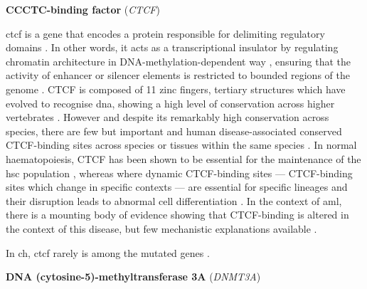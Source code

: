 \noindent \textbf{CCCTC-binding factor} (\textit{CTCF})

\Ac{ctcf} is a gene that encodes a protein responsible for delimiting regulatory domains \cite{Jeong2004-xv}. In other words, it acts as a transcriptional insulator by regulating chromatin architecture in DNA-methylation-dependent way \cite{Wang2012-gj}, ensuring that the activity of enhancer or silencer elements is restricted to bounded regions of the genome \cite{Kuhn2003-zj}. CTCF is composed of 11 zinc fingers, tertiary structures which have evolved to recognise \ac{dna}, showing a high level of conservation across higher vertebrates \cite{Filippova1996-lz}. However and despite its remarkably high conservation across species, there are few but important and human disease-associated conserved CTCF-binding sites across species \cite{Martin2011-iz} or tissues within the same species \cite{Azazi2020-lr}. In normal haematopoiesis, CTCF has been shown to be essential for the maintenance of the \ac{hsc} population \cite{Kim2017-of}, whereas where dynamic CTCF-binding sites --- CTCF-binding sites which change in specific contexts --- are essential for specific lineages and their disruption leads to abnormal cell differentiation \cite{Qi2021-do}. In the context of \ac{aml}, there is a mounting body of evidence showing that CTCF-binding is altered in the context of this disease, but few mechanistic explanations available \cite{Qiu2020-wn}.

In \ac{ch}, \ac{ctcf} rarely is among the mutated genes \cite{Jaiswal2014-rl,Genovese2014-eu,Zehir2017-gh,Xie2014-np}.

\noindent \textbf{DNA (cytosine-5)-methyltransferase 3A} (\textit{DNMT3A})

